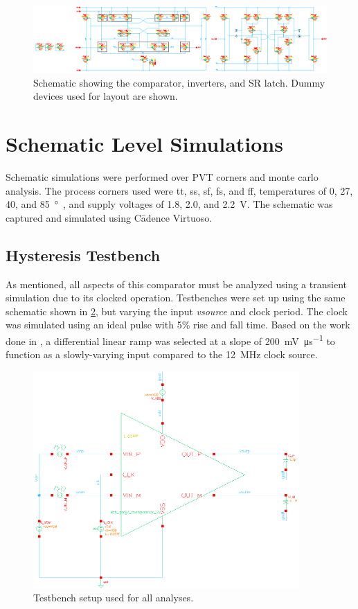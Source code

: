 \documentclass[11pt,letterpaper]{article}
\begin{document}
\begin{figure}[htbp]
    \centering
    \includegraphics[width=\textwidth]{images/sch_full.eps}
    \caption{Schematic showing the comparator, inverters, and SR latch. Dummy devices used for layout are shown.}
    \label{fig:full-sch}
\end{figure}

\section{Schematic Level Simulations}

Schematic simulations were performed over PVT corners and monte carlo analysis. The process corners used were tt, ss, sf, fs, and ff, temperatures of 0, 27, 40, and \qty{85}{\degree\C}, and supply voltages of 1.8, 2.0, and \qty{2.2}{\V}. The schematic was captured and simulated using C\=adence Virtuoso.

\subsection{Hysteresis Testbench}

As mentioned, all aspects of this comparator must be analyzed using a transient simulation due to its clocked operation. Testbenches were set up using the same schematic shown in \cref{fig:tb-sch}, but varying the input \emph{vsource} and clock period. The clock was simulated using an ideal pulse with 5\% rise and fall time. Based on the work done in \cite{Khanfir2020_1}, a differential linear ramp was selected at a slope of \qty{200}{\mV\per\us} to function as a slowly-varying input compared to the \qty{12}{\MHz} clock source. 

\begin{figure}[!t]
    \centering
    \includegraphics[width=4in]{images/sch_tb_prop_hyst.eps}
    \caption{Testbench setup used for all analyses.}
    \label{fig:tb-sch}
\end{figure}
\end{document}
